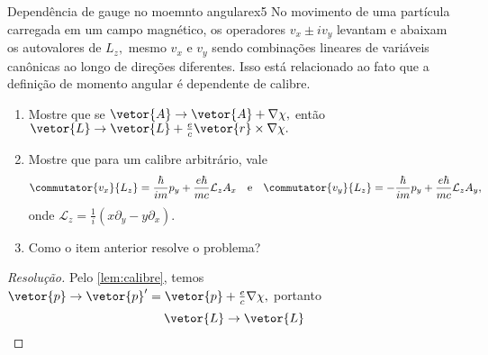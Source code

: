 \begin{exercício}{Dependência de gauge no moemnto angular}{ex5}
   No movimento de uma partícula carregada em um campo magnético, os operadores \(v_x \pm i v_y\) levantam e abaixam os autovalores de \(L_z,\) mesmo \(v_x\) e \(v_y\) sendo combinações lineares de variáveis canônicas ao longo de direções diferentes. Isso está relacionado ao fato que a definição de momento angular é dependente de calibre.
   \begin{enumerate}[label=(\alph*)]
      \item Mostre que se \(\vetor{A} \to \vetor{A} + \nabla\chi,\) então \(\vetor{L} \to \vetor{L} + \frac{e}{c} \vetor{r} \times \nabla\chi.\)
      \item Mostre que para um calibre arbitrário, vale
         \begin{equation*}
            \commutator{v_x}{L_z} = \frac{\hbar}{im} p_y + \frac{e \hbar}{mc} \mathcal{L}_z A_x
            \quad\text{e}\quad
            \commutator{v_y}{L_z} = -\frac{\hbar}{im} p_y + \frac{e \hbar}{mc} \mathcal{L}_z A_y,
         \end{equation*}
         onde \(\mathcal{L}_z = \frac1i \left(x \partial_y - y \partial_x\right).\)
      \item Como o item anterior resolve o problema?
   \end{enumerate}
\end{exercício}
\begin{proof}[Resolução]
   Pelo \cref{lem:calibre}, temos \(\vetor{p} \to \vetor{p}' = \vetor{p} + \frac{e}{c} \nabla \chi,\) portanto
   \begin{equation*}
      \vetor{L} \to \vetor{L}
   \end{equation*}
\end{proof}

